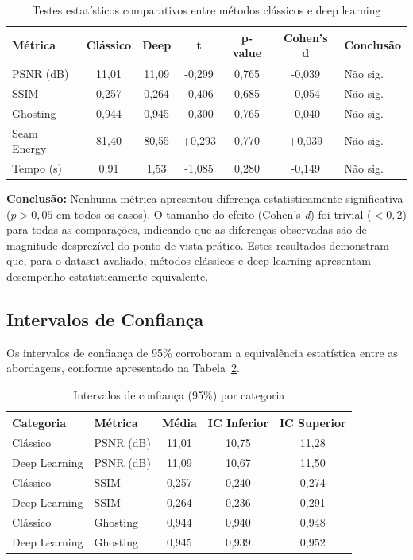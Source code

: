 \begin{table}[htb]
\centering
\caption{Testes estatísticos comparativos entre métodos clássicos e deep learning}
\label{tab:testes_comparativos}
\small
\begin{tabular}{lcccccl}
\hline
\textbf{Métrica} & \textbf{Clássico} & \textbf{Deep} & \textbf{t} & \textbf{p-value} & \textbf{Cohen's d} & \textbf{Conclusão} \\ \hline
PSNR (dB) & 11,01 & 11,09 & -0,299 & 0,765 & -0,039 & Não sig. \\
SSIM & 0,257 & 0,264 & -0,406 & 0,685 & -0,054 & Não sig. \\
Ghosting & 0,944 & 0,945 & -0,300 & 0,765 & -0,040 & Não sig. \\
Seam Energy & 81,40 & 80,55 & +0,293 & 0,770 & +0,039 & Não sig. \\
Tempo (s) & 0,91 & 1,53 & -1,085 & 0,280 & -0,149 & Não sig. \\
\hline
\end{tabular}
\end{table}

\textbf{Conclusão:} Nenhuma métrica apresentou diferença estatisticamente significativa ($p>0{,}05$ em todos os casos). O tamanho do efeito (Cohen's \textit{d}) foi trivial ($<0{,}2$) para todas as comparações, indicando que as diferenças observadas são de magnitude desprezível do ponto de vista prático. Estes resultados demonstram que, para o dataset avaliado, métodos clássicos e deep learning apresentam desempenho estatisticamente equivalente.

\subsection{Intervalos de Confiança}

Os intervalos de confiança de 95\% corroboram a equivalência estatística entre as abordagens, conforme apresentado na Tabela~\ref{tab:intervalos_confianca}.

\begin{table}[htb]
\centering
\caption{Intervalos de confiança (95\%) por categoria}
\label{tab:intervalos_confianca}
\small
\begin{tabular}{llccc}
\hline
\textbf{Categoria} & \textbf{Métrica} & \textbf{Média} & \textbf{IC Inferior} & \textbf{IC Superior} \\ \hline
Clássico & PSNR (dB) & 11,01 & 10,75 & 11,28 \\
Deep Learning & PSNR (dB) & 11,09 & 10,67 & 11,50 \\
Clássico & SSIM & 0,257 & 0,240 & 0,274 \\
Deep Learning & SSIM & 0,264 & 0,236 & 0,291 \\
Clássico & Ghosting & 0,944 & 0,940 & 0,948 \\
Deep Learning & Ghosting & 0,945 & 0,939 & 0,952 \\
\hline
\end{tabular}
\end{table}

